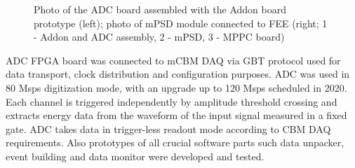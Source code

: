 \documentclass[a4paper,11pt]{article}
\begin{document}
\begin{figure}[htbp]
\centering %
\qquad
{}
\caption{\label{fig:4} Photo of the ADC board assembled with the Addon board prototype (left); photo of mPSD module connected to FEE (right; 1 - Addon and ADC assembly, 2 - mPSD, 3 - MPPC board)}
\end{figure}

ADC FPGA board was connected to mCBM DAQ via GBT protocol used for data transport, clock distribution and configuration purposes. ADC was used in 80 Msps digitization mode, with an upgrade up to 120 Msps scheduled in 2020. Each channel is triggered independently by amplitude threshold crossing and extracts energy data from the waveform of the input signal measured in a fixed gate. ADC takes data in trigger-less readout mode according to CBM DAQ requirements. Also prototypes of all crucial software parts such data unpacker, event building and data monitor were developed and tested.
\end{document}
